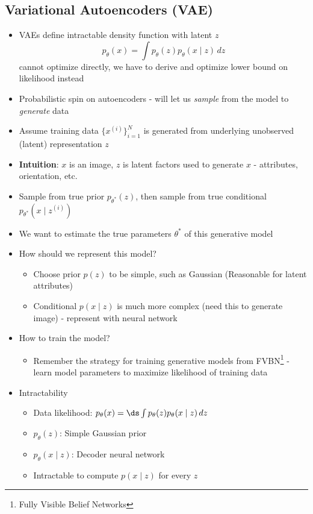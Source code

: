 \subsection{Variational Autoencoders (VAE)}
\begin{itemize}
	\item VAEs define intractable density function with latent $z$
	$$p_\theta (x) = \int p_\theta (z) p_\theta (x\mid z)\, dz$$
	cannot optimize directly, we have to derive and optimize lower bound on likelihood instead
	\item Probabilistic spin on autoencoders - will let us \textit{sample} from the model to \textit{generate} data
	\item Assume training data $\{x^{(i)}\}_{i=1}^N$ is generated from underlying unobserved (latent) representation $z$
	\item \textbf{Intuition}: $x$ is an image, $z$ is latent factors used to generate $x$ - attributes, orientation, etc.
	\item Sample from true prior $p_{\theta^\ast}(z)$, then sample from true conditional $p_{\theta^\ast}(x\mid z^{(i)})$
	\item We want to estimate the true parameters $\theta^\ast$ of this generative model
	\item How should we represent this model?
	\begin{itemize}
		\item Choose prior $p(z)$ to be simple, such as Gaussian (Reasonable for latent attributes)
		\item Conditional $p(x\mid z)$ is much more complex (need this to generate image) - represent with neural network
	\end{itemize}
	\item How to train the model?
	\begin{itemize}
		\item Remember the strategy for training generative models from FVBN\footnote{Fully Visible Belief Networks} - learn model parameters to maximize likelihood of training data
	\end{itemize}
	\item Intractability
	\begin{itemize}
		\item Data likelihood: $p_\theta(x) = \ds \int p_\theta(z) p_\theta(x\mid z)\,dz$
		\item $p_\theta(z)$: Simple Gaussian prior
		\item $p_\theta(x\mid z)$: Decoder neural network
		\item Intractable to compute $p(x\mid z)$ for every $z$

\end{itemize}
\end{itemize}
